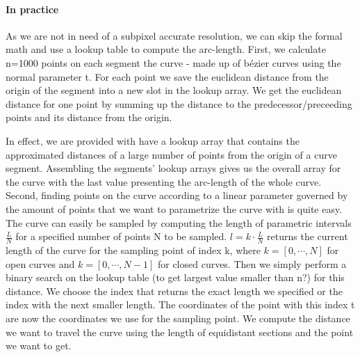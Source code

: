 \paragraph{In practice}
As we are not in need of a subpixel accurate resolution, we can skip the formal math and use a lookup table to compute the arc-length.
First, we calculate n=1000 points on each segment the curve - made up of b\'{e}zier curves using the normal parameter t. For each point we save the euclidean distance from the origin of the segment into a new slot in the lookup array. We get the euclidean distance for one point by summing up the distance to the predecessor/preceeding points and its distance from the origin.\\
\begin{figure}[h!]
\end{figure}
In effect, we are provided with have a lookup array that contains the approximated distances of a large number of points from the origin of a curve segment. Assembling the segments' lookup arrays gives us the overall array for the curve with the last value presenting the arc-length of the whole curve.\\ 
Second, finding points on the curve according to a linear parameter governed by the amount of points that we want to parametrize the curve with is quite easy. The curve can easily be sampled by computing the length of parametric intervals $\frac{L}{N}$ for a specified number of points N to be sampled. $l=k \cdot \frac{L}{N}$ returns the current length of the curve for the sampling point of index k, where $k=[0,\cdots,N]$ for open curves and $k=[0,\cdots,N-1]$ for closed curves.
Then we simply perform a binary search on the lookup table (to get largest value smaller than n?) for this distance. We choose the index that returns the exact length we specified or the index with the next smaller length. The coordinates of the point with this index t are now the coordinates we use for the sampling point.
We compute the distance we want to travel the curve using the length of equidistant sections and the point we want to get.
